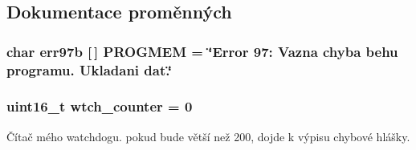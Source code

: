 \subsection{Dokumentace proměnných}
\subsubsection[{PROGMEM}]{\setlength{\rightskip}{0pt plus 5cm}char err97b [$\,$] {\bf PROGMEM} = \char`\"{}Error 97: Vazna chyba behu programu. Ukladani dat.\char`\"{}\hspace{0.3cm}{\ttfamily  [static]}}\label{watchdog_8c_a82348d6937f5354d885236312473f51f}
\subsubsection[{wtch\_\-counter}]{\setlength{\rightskip}{0pt plus 5cm}uint16\_\-t {\bf wtch\_\-counter} = 0}\label{watchdog_8c_a65366c710bff228f8a652480055368bc}


Čítač mého watchdogu. pokud bude větší než 200, dojde k výpisu chybové hlášky. 
